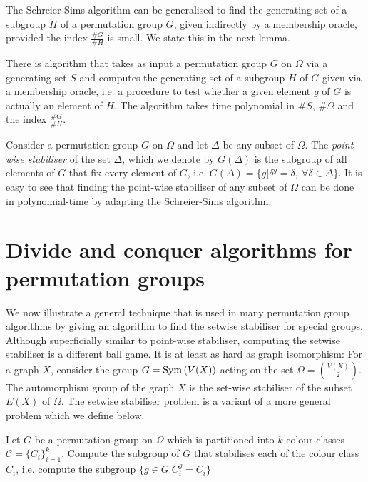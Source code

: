 \documentclass{article}
\begin{document}
The Schreier-Sims algorithm can be generalised to find the generating
set of a subgroup $H$ of a permutation group $G$, given indirectly by
a membership oracle, provided the index $\frac{\#G}{\# H}$ is
small. We state this in the next lemma.

\begin{lemma}\label{lem-general-schrier-sims}
  There is algorithm that takes as input a permutation group $G$ on
  $\Omega$ via a generating set $S$ and computes the generating set of
  a subgroup $H$ of $G$ given via a membership oracle, i.e. a
  procedure to test whether a given element $g$ of $G$ is actually an
  element of $H$. The algorithm takes time polynomial in $\# S$, $\#
  \Omega$ and the index $\frac{\# G}{\# H}$.
\end{lemma}

Consider a permutation group $G$ on $\Omega$ and let $\Delta$ be any
subset of $\Omega$. The \emph{point-wise stabiliser} of the set
$\Delta$, which we denote by $G(\Delta)$ is the subgroup of all
elements of $G$ that fix every element of $G$, i.e. $G(\Delta) = \{ g
| \delta^g = \delta,\ \forall \delta \in \Delta\}$. It is easy to see
that finding the point-wise stabiliser of any subset of $\Omega$ can
be done in polynomial-time by adapting the Schreier-Sims algorithm.

\section{Divide and conquer algorithms for permutation groups}

We now illustrate a general technique that is used in many permutation
group algorithms by giving an algorithm to find the setwise stabiliser
for special groups. Although superficially similar to point-wise
stabiliser, computing the setwise stabiliser is a different ball
game. It is at least as hard as graph isomorphism: For a graph $X$,
consider the group $G = \mathrm{Sym}\left(V(X)\right)$ acting on the set $\Omega = {V(X)
  \choose 2}$. The automorphism group of the graph $X$ is the set-wise
stabiliser of the subset $E(X)$ of $\Omega$. The setwise stabiliser
problem is a variant of a more general problem which we define below.

\begin{problem}
  Let $G$ be a permutation group on $\Omega$ which is partitioned into
  $k$-colour classes $\mathcal{C} = \{C_i \}_{i=1}^k$. Compute the
  subgroup of $G$ that stabilises each of the colour class $C_i$, i.e.
  compute the subgroup $\{ g \in G | C_i^g = C_i \}$
\end{problem}
\end{document}
